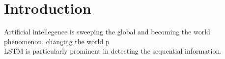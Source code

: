 \section{Introduction}
Artificial intellegence is sweeping the global and becoming the world phenomenon, changing the world p
\\
LSTM is particularly prominent in detecting the sequential information. 